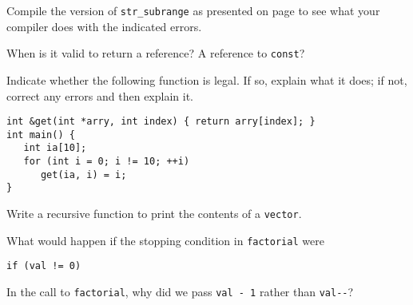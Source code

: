 %
%
\begin{question}
Compile the version of \verb|str_subrange| as presented on
page \pageref{lst:str-subrange} to see what your compiler does with the indicated errors.
\end{question}

\begin{question}
When is it valid to return a reference? A reference to \verb|const|?
\end{question}

\begin{question}
Indicate whether the following function is legal. If so, explain
what it does; if not, correct any errors and then explain it.
\begin{lstlisting}
int &get(int *arry, int index) { return arry[index]; }
int main() {
   int ia[10];
   for (int i = 0; i != 10; ++i)
      get(ia, i) = i;
}
\end{lstlisting}
\end{question}

\begin{question}\label{qst:a recursive function to print the contents of a vector}
Write a recursive function to print the contents of a \verb|vector|.
\end{question}

\begin{question}
What would happen if the stopping condition in \verb|factorial|
were
\begin{lstlisting}
if (val != 0)
\end{lstlisting}
\end{question}

\begin{question}
In the call to  \verb|factorial|, why did we pass \verb|val - 1| rather than
\verb|val--|?
\end{question}
